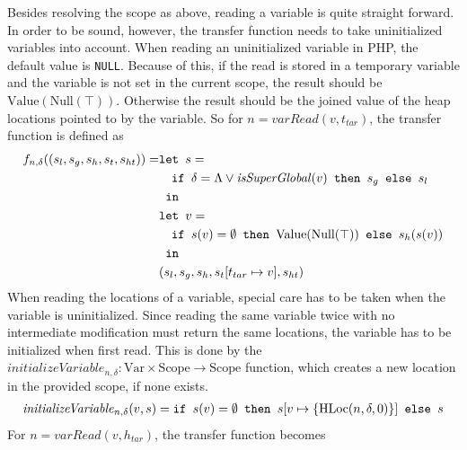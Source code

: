 Besides resolving the scope as above, reading a variable is quite straight forward. In order to be sound, however, the transfer function needs to take uninitialized variables into account. When reading an uninitialized variable in PHP, the default value is \texttt{NULL}. Because of this, if the read is stored in a temporary variable and the variable is not set in the current scope, the result should be $\text{Value}(\text{Null}(\top))$. Otherwise the result should be the joined value of the heap locations pointed to by the variable. So for $n = \mathit{varRead}(v,t_{tar})$, the transfer function is defined as
\begin{align}
f_{n, \delta} ((s_l,s_g,s_h,s_t, s_{ht})) = &\texttt{let } s = \notag\\
                                            &\quad\texttt{if }\delta = \Lambda \vee \mathit{isSuperGlobal}(v)\texttt{ then } s_g \texttt{ else } s_l\notag\\
                                            & \texttt{ in }\notag\\
                                            &\texttt{let } v = \notag\\
                                            &\quad\texttt{if }s(v) = \emptyset\texttt{ then } \text{Value}(\text{Null}(\top)) \texttt{ else } s_h(s(v))\notag\\
                                            & \texttt{ in }\notag\\
                                            &(s_l,s_g,s_h,s_t[t_{tar}\mapsto v], s_{ht})
\end{align}
When reading the locations of a variable, special care has to be taken when the variable is uninitialized. Since reading the same variable twice with no intermediate modification must return the same locations, the variable has to be initialized when first read. This is done by the $\mathit{initializeVariable}_{n,\delta} : \text{Var}\times\text{Scope}\rightarrow \text{Scope}$ function, which creates a new location in the provided scope, if none exists. 
\begin{align}
\mathit{initializeVariable}_{n, \delta}(v,s) = \texttt{if }s(v) = \emptyset\texttt{ then } s[v\mapsto \{\text{HLoc}(n,\delta, 0)\}] \texttt{ else } s
\end{align}
For $n = \mathit{varRead}(v,h_{tar})$, the transfer function becomes


